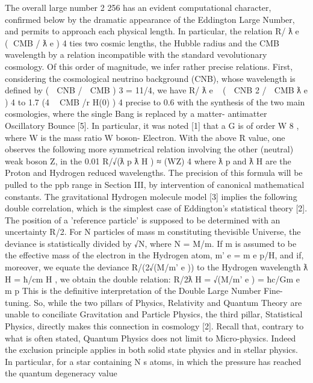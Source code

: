 The overall large number 2 256 has an evident computational character, confirmed below by the
dramatic appearance of the Eddington Large Number, and permits to approach each physical length.
In particular, the relation R/ ƛ e ~ ( CMB / ƛ e ) 4 ties two cosmic lengths, the Hubble radius and the CMB
wavelength by a relation incompatible with the standard vevolutionary cosmology. Of this order of
magnitude, we infer rather precise relations. First, considering the cosmological neutrino
background (CNB), whose wavelength is defined by (  CNB /  CMB ) 3 = 11/4, we have R/ ƛ e ~
(  CNB 2 /  CMB ƛ e ) 4 to 1.7 %
(4  CMB /r H(0) ) 4 precise to 0.6 %
with the synthesis of the two main cosmologies, where the single Bang is replaced by a matter-
antimatter Oscillatory Bounce [5].
In particular, it was noted [1] that a G is of order W 8 , where W is the mass ratio W boson-
Electron. With the above R value, one observes the following more symmetrical relation involving
the other (neutral) weak boson Z, in the 0.01 %
R/√(ƛ p ƛ H ) ≈ (WZ) 4
where ƛ p and ƛ H are the Proton and Hydrogen reduced wavelengths. The precision of this formula
will be pulled to the ppb range in Section III, by intervention of canonical mathematical constants.
The gravitational Hydrogen molecule model [3] implies the following double correlation,
which is the simplest case of Eddington's statistical theory [2]. The position of a 'reference particle'
is supposed to be determined with an uncertainty R/2. For N particles of mass m constituting thevisible Universe, the deviance is statistically divided by √N, where N = M/m. If m is assumed to be
the effective mass of the electron in the Hydrogen atom, m' e = m e p/H, and if, moreover, we equate
the deviance R/(2√(M/m' e )) to the Hydrogen wavelength ƛ H = ħ/cm H , we obtain the double relation:
R/2ƛ H = √(M/m' e ) = ħc/Gm e m p
This is the definitive interpretation of the Double Large Number Fine-tuning. So, while the two
pillars of Physics, Relativity and Quantum Theory are unable to conciliate Gravitation and Particle
Physics, the third pillar, Statistical Physics, directly makes this connection in cosmology [2].
Recall that, contrary to what is often stated, Quantum Physics does not limit to Micro-physics.
Indeed the exclusion principle applies in both solid state physics and in stellar physics. In particular,
for a star containing N s atoms, in which the pressure has reached the quantum degeneracy value
